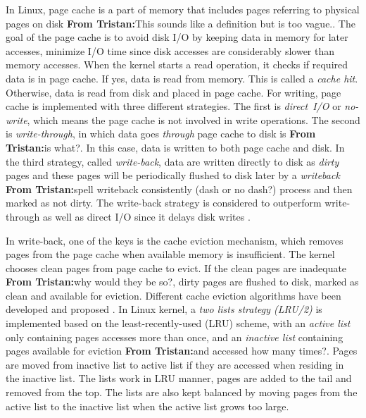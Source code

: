 \documentclass[conference]{IEEEtran}
\newcommand{\tristan}[1]{\color{orange}\textbf{From Tristan:}#1\color{black}}
\newcommand{\english}[1]{\uwave{#1}}
\begin{document}
			In Linux, page cache is a part of memory that includes pages referring to 
			physical pages on disk \cite{linuxdev3rd2010} \tristan{This sounds like a definition but is too vague.}. 
			The goal of the page cache is to avoid disk I/O by keeping data in memory 
			for later accesses, minimize I/O time since disk accesses are considerably 
			slower than memory accesses.
			When the kernel starts a read operation, it checks if required data is in page cache.
			If yes, data is read from memory. This is called a \textit{cache hit}. 
			Otherwise, data is read from disk and placed in page cache.
			For writing, page cache is implemented with three different strategies. 
			The first is \textit{direct~I/O} or \textit{no-write}, which means the page cache 
			is not involved in write operations. 
			The second is \textit{write-through}, in which data goes \textit{through} 
			page cache to disk is \tristan{is what?}. In this case, data is written to both page cache and disk. 
			In the third strategy, called \textit{write-back}, data are written directly 
			to disk as \textit{dirty} pages and these pages will be periodically flushed 
			to disk later by a \textit{writeback} \tristan{spell writeback consistently (dash or no dash?)} process and then marked as not dirty. 
			The write-back strategy is considered to outperform write-through as well as 
			direct I/O since it delays disk writes \english{ and perform in batch later }
			\cite{linuxdev3rd2010}. 
			
			In write-back, one of the keys is the cache eviction mechanism, which 
			removes pages from the page cache when available memory is insufficient. 
			The kernel chooses clean pages from page cache to evict. 
			If the clean pages are inadequate \tristan{why would they be so?}, dirty pages are flushed to disk, 
			marked as clean and available for eviction. 
			Different cache eviction algorithms have been developed and proposed
			\cite{owda2014comparison}.
			In Linux kernel, a \textit{two lists strategy (LRU/2)} is implemented based on 
			the least-recently-used (LRU) scheme, with an \textit{active list} only containing 
			pages accesses more than once, and an \textit{inactive list} containing 
			pages available for eviction \tristan{and accessed how many times?}. 
			Pages are moved from inactive list to active list if they are 
			accessed when residing in the inactive list. 
			The lists work in LRU manner, pages are added to the tail and removed 
			from the top. 
			The lists are also kept balanced by moving pages from the active list
			to the inactive list when the active list grows too large. 
			 
\end{document}
